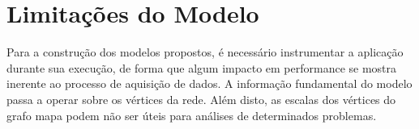 
\section{Limitações do Modelo}

Para a construção dos modelos propostos, é necessário instrumentar a aplicação
durante sua execução, de forma que algum impacto em performance se mostra
inerente ao processo de aquisição de dados. A informação fundamental do modelo
passa a operar sobre os vértices da rede. Além disto, as escalas dos vértices do
grafo mapa podem não ser úteis para análises de determinados problemas.
